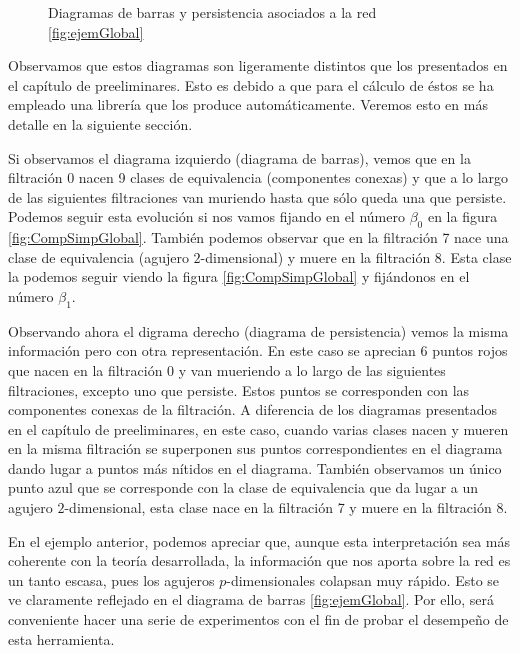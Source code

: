 \documentclass[12pt, a4paper, twoside]{book}
\numberwithin{equation}{section}
\theoremstyle{definition}
\newenvironment{ejem}
  {\pushQED{\qed}\renewcommand{\qedsymbol}{$\blacktriangleleft$}\ejemplo}
  {\popQED\endejemplo}
\theoremstyle{remark}
\theoremstyle{plain}
\begin{document}
\begin{ejem}
\begin{figure}[H]
\begin{figure}[H]
			\end{figure}
		\endminipage
		\caption{Diagramas de barras y persistencia asociados a la red 
		\ref{fig:ejemGlobal}}
	\end{figure}
	Observamos que estos diagramas son ligeramente distintos que los 
	presentados en el capítulo de preeliminares. Esto es debido a que para
	el cálculo de éstos se ha empleado una librería que los produce 
	automáticamente. Veremos esto en más detalle en la siguiente sección.

	Si observamos el diagrama izquierdo (diagrama de barras), vemos que en 
	la filtración 0 nacen 9 clases de equivalencia (componentes conexas) y
	que a lo largo de las siguientes filtraciones van muriendo hasta que 
	sólo queda una que persiste. Podemos seguir esta evolución si nos 
	vamos fijando en el número $\beta_{0}$ en la figura 
	\ref{fig:CompSimpGlobal}. También podemos observar que en la 
	filtración 7 nace una clase de equivalencia (agujero $2$-dimensional) 
	y muere en la filtración 8. Esta clase la podemos seguir viendo la 
	figura \ref{fig:CompSimpGlobal} y fijándonos en el número $\beta_{1}$.

	Observando ahora el digrama derecho (diagrama de persistencia) vemos 
	la misma información pero con otra representación. En este caso se 
	aprecian 6 puntos rojos que nacen en la filtración 0 y van mueriendo a 
	lo largo de las siguientes filtraciones, excepto uno que persiste. 
	Estos puntos se corresponden 
	con las componentes conexas de la filtración. A diferencia de los 
	diagramas presentados en el capítulo de preeliminares, en este caso, 
	cuando varias clases nacen y mueren en la misma filtración se 
	superponen sus puntos correspondientes en el diagrama dando lugar a 
	puntos más nítidos en el diagrama. También observamos un único punto 
	azul que se corresponde con la clase de equivalencia que da lugar a un
	agujero $2$-dimensional, esta clase nace en la filtración 7 y muere en
	la filtración 8.

	\end{ejem}

	En el ejemplo anterior, podemos apreciar que, aunque esta 
	interpretación sea más coherente con la teoría desarrollada, la 
	información que nos aporta sobre la red es un tanto escasa, pues los 
	agujeros $p$-dimensionales colapsan muy rápido. Esto se ve claramente 
	reflejado en el diagrama de barras \ref{fig:ejemGlobal}. Por ello, 
	será conveniente hacer una serie de experimentos con el fin de probar
	el desempeño de esta herramienta.
\end{document}
